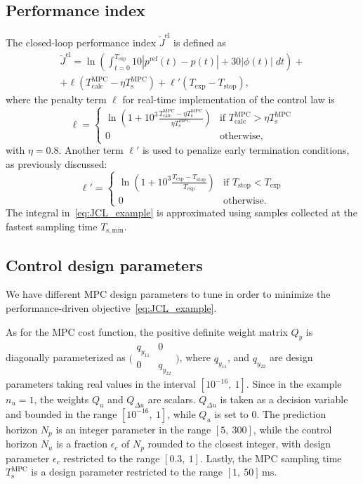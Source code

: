 \documentclass{article}
\newcommand{\Texp}{T_{\mathrm{exp}}}
\newcommand{\Tstop}{T_{\mathrm{stop}}}
\newcommand{\TMPC}{T_{\mathrm{s}}^{\mathrm{MPC}}}
\newcommand{\TCALCMPC}{T_{\mathrm{calc}}^{\mathrm{MPC}}}
\newcommand{\Nu}{N_u}
\newcommand{\Nc}{\Nu}
\newcommand{\Np}{N_p}
\newcommand{\Tsmin}{T_{\mathrm{s,min}}}
\newcommand{\JCt}{{\tilde{J}^\mathrm{cl}}}
\begin{document}
\subsection{Performance index}
The closed-loop performance index $\JCt$ is defined as 
\begin{multline}
\label{eq:JCL_example}
 \JCt =  \ln \left ( \int_{t=0}^{\Texp}10 |p^{\mathrm{ref}}(t) - p(t)| +  30 |\phi(t)|\;dt \right )+ \\
  +  \ell\left(\TCALCMPC - \eta \TMPC\right) + \ell'(\Texp - \Tstop),
\end{multline}  
where the penalty term $\ell$ for real-time implementation of the control law is
\begin{equation}
\label{eq:penalty}
 \ell\!=\! \begin{cases} 
 \!\ln \left(1+ 10^3\frac{\TCALCMPC\!-\!\eta \TMPC}{\eta \TMPC}\right)&\text{if } \TCALCMPC > \eta \TMPC\\
 0 &\text{otherwise},
 \end{cases}
\end{equation}
with $\eta = 0.8$. Another term $\ell'$ is used to penalize early termination conditions, as previously discussed:
\begin{equation}
\label{eq:penalty_time}
 \ell'\!=\! \begin{cases} 
 \!\ln \left(1+ 10^3\frac{\Texp\!-\!\Tstop}{\Texp}\right)&\text{if } \Tstop < \Texp\\
 0 & \text{otherwise}.
 \end{cases}
\end{equation}
The integral in~\eqref{eq:JCL_example} is approximated using samples collected at the fastest sampling time $\Tsmin$. 

\subsection{Control design parameters}
We have different MPC design parameters to tune in order to minimize the performance-driven
objective~\eqref{eq:JCL_example}.

As for the MPC cost function, the positive definite weight matrix $Q_y$ is diagonally parameterized as 
$\bigl( \begin{smallmatrix}
  q_{y_{11}}&0\\ 0&q_{y_{22}}
\end{smallmatrix} \bigr)$, 
where $q_{y_{11}}$, and $q_{y_{22}}$ are design parameters taking real values in the interval $[10^{-16},\   1]$.  Since in the example $n_u=1$, the weights $Q_u$ and $Q_{\Delta u}$  are  scalars.  $Q_{\Delta u}$ is taken as a decision variable and bounded in the range $[10^{-16} ,\  1]$, while $Q_u$ is set to 0. The prediction horizon $\Np$ is an integer  parameter in the range $[5,\ 300]$, while the control horizon $\Nc$ is a fraction $\epsilon_c$ of $\Np$ rounded  to the closest integer,  with design parameter $\epsilon_c$ restricted to the range $[0.3,\ 1]$. Lastly, the MPC sampling time $\TMPC$ is  a design parameter restricted to the range $[1,\ 50]\,\mathrm{ms}$.
\end{document}
